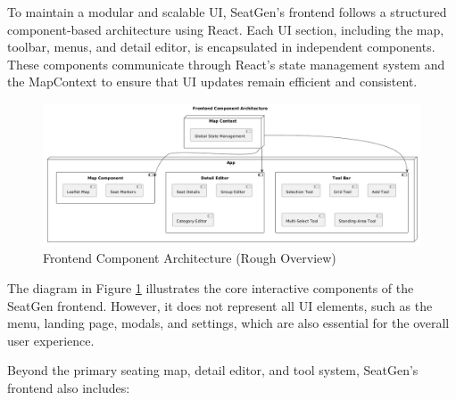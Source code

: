 To maintain a modular and scalable UI, SeatGen’s frontend follows a structured component-based architecture using React. Each UI section, including the map, toolbar, menus, and detail editor, is encapsulated in independent components. These components communicate through React’s state management system and the MapContext to ensure that UI updates remain efficient and consistent.

\begin{figure}[H]
    \begin{center}
        \includegraphics[scale=0.3]{pics/frontend_architecture.png}
    \end{center}
    \caption{Frontend Component Architecture (Rough Overview)}
    \label{fig:frontend-architecture}
\end{figure}

The diagram in Figure \ref{fig:frontend-architecture} illustrates the core interactive components of the SeatGen frontend. However, it does not represent all UI elements, such as the menu, landing page, modals, and settings, which are also essential for the overall user experience.

Beyond the primary seating map, detail editor, and tool system, SeatGen's frontend also includes:

